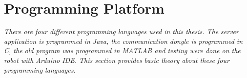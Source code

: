 \section{Programming Platform}
\label{sec:tProgrammingPlatform}
\textit{There are four different programming languages used in this thesis. The server application is programmed in Java, the communication dongle is programmed in C, the old program was programmed in MATLAB and testing were done on the robot with Arduino IDE. This section provides basic theory about these four programming languages.}



